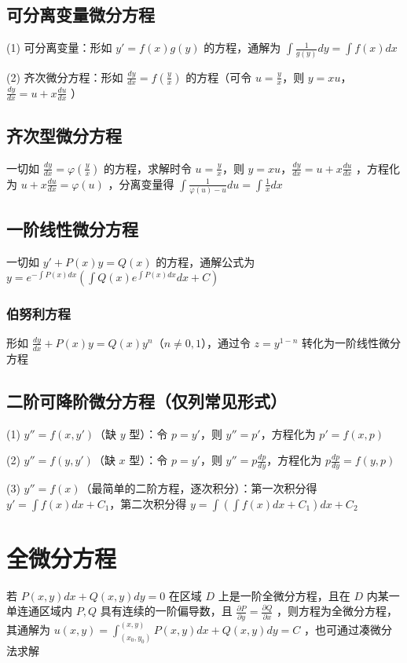\documentclass[UTF8]{ctexart}
\theoremstyle{remark}
\begin{document}
	\subsection{可分离变量微分方程}
	(1) 可分离变量：形如 \(y' = f(x)g(y)\) 的方程，通解为 \(\int \frac{1}{g(y)} dy = \int f(x) dx\) 
	
	(2) 齐次微分方程：形如 \(\frac{dy}{dx} = f\left(\frac{y}{x}\right)\) 的方程（可令 \(u = \frac{y}{x}\)，则 \(y = xu\)，\(\frac{dy}{dx} = u + x\frac{du}{dx}\) ）
	
	\subsection{齐次型微分方程}
	一切如 \(\frac{dy}{dx} = \varphi\left(\frac{y}{x}\right)\) 的方程，求解时令 \(u = \frac{y}{x}\)，则 \(y = xu\)，\(\frac{dy}{dx} = u + x\frac{du}{dx}\) ，方程化为 \(u + x\frac{du}{dx} = \varphi(u)\) ，分离变量得 \(\int \frac{1}{\varphi(u) - u} du = \int \frac{1}{x} dx\) 
	
	\subsection{一阶线性微分方程}
	一切如 \(y' + P(x)y = Q(x)\) 的方程，通解公式为 \(y = e^{-\int P(x) dx} \left( \int Q(x) e^{\int P(x) dx} dx + C \right)\) 
	
	\subsubsection{伯努利方程}
	形如 \(\frac{dy}{dx} + P(x)y = Q(x)y^n\)（\(n \neq 0,1\)），通过令 \(z = y^{1 - n}\) 转化为一阶线性微分方程
	
	\subsection{二阶可降阶微分方程（仅列常见形式）}
	(1) \(y'' = f(x,y')\)（缺 \(y\) 型）：令 \(p = y'\)，则 \(y'' = p'\)，方程化为 \(p' = f(x,p)\) 
	
	(2) \(y'' = f(y,y')\)（缺 \(x\) 型）：令 \(p = y'\)，则 \(y'' = p\frac{dp}{dy}\)，方程化为 \(p\frac{dp}{dy} = f(y,p)\) 
	
	(3) \(y'' = f(x)\)（最简单的二阶方程，逐次积分）：第一次积分得 \(y' = \int f(x) dx + C_1\)，第二次积分得 \(y = \int \left( \int f(x) dx + C_1 \right) dx + C_2\) 
	
	\section{全微分方程}
	若 \(P(x,y)dx + Q(x,y)dy = 0\) 在区域 \(D\) 上是一阶全微分方程，且在 \(D\) 内某一单连通区域内 \(P,Q\) 具有连续的一阶偏导数，且 \(\frac{\partial P}{\partial y} = \frac{\partial Q}{\partial x}\) ，则方程为全微分方程，其通解为 \(u(x,y) = \int_{(x_0,y_0)}^{(x,y)} P(x,y)dx + Q(x,y)dy = C\) ，也可通过凑微分法求解
	
\end{document}
